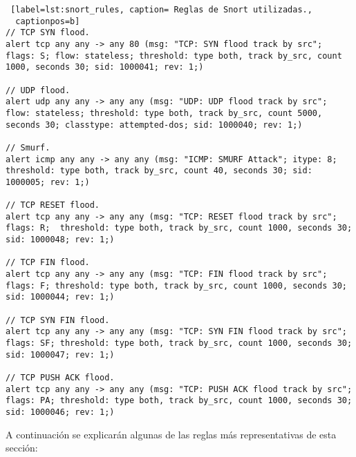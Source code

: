 \begin{lstlisting} [label=lst:snort_rules, caption= Reglas de Snort utilizadas.,
  captionpos=b]
// TCP SYN flood.
alert tcp any any -> any 80 (msg: "TCP: SYN flood track by src"; flags: S; flow: stateless; threshold: type both, track by_src, count 1000, seconds 30; sid: 1000041; rev: 1;)

// UDP flood.
alert udp any any -> any any (msg: "UDP: UDP flood track by src"; flow: stateless; threshold: type both, track by_src, count 5000, seconds 30; classtype: attempted-dos; sid: 1000040; rev: 1;)

// Smurf.
alert icmp any any -> any any (msg: "ICMP: SMURF Attack"; itype: 8; threshold: type both, track by_src, count 40, seconds 30; sid: 1000005; rev: 1;) 

// TCP RESET flood.
alert tcp any any -> any any (msg: "TCP: RESET flood track by src"; flags: R;  threshold: type both, track by_src, count 1000, seconds 30; sid: 1000048; rev: 1;)

// TCP FIN flood.
alert tcp any any -> any any (msg: "TCP: FIN flood track by src"; flags: F; threshold: type both, track by_src, count 1000, seconds 30; sid: 1000044; rev: 1;)

// TCP SYN FIN flood.
alert tcp any any -> any any (msg: "TCP: SYN FIN flood track by src"; flags: SF; threshold: type both, track by_src, count 1000, seconds 30; sid: 1000047; rev: 1;)

// TCP PUSH ACK flood.
alert tcp any any -> any any (msg: "TCP: PUSH ACK flood track by src"; flags: PA; threshold: type both, track by_src, count 1000, seconds 30; sid: 1000046; rev: 1;)
\end{lstlisting}

A continuación se explicarán algunas de las reglas más representativas de esta
sección:

